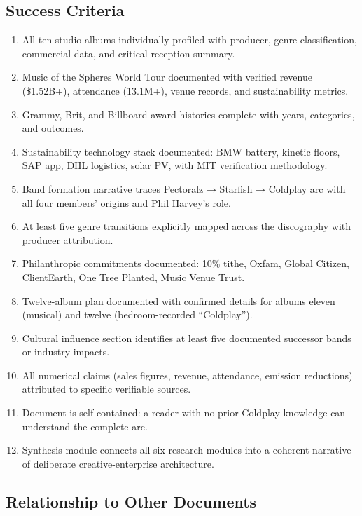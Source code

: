 \documentclass[11pt,letterpaper]{article}
\begin{document}
\subsection{Success Criteria}

\begin{enumerate}[leftmargin=2em]
  \item All ten studio albums individually profiled with producer, genre classification, commercial data, and critical reception summary.
  \item Music of the Spheres World Tour documented with verified revenue (\$1.52B+), attendance (13.1M+), venue records, and sustainability metrics.
  \item Grammy, Brit, and Billboard award histories complete with years, categories, and outcomes.
  \item Sustainability technology stack documented: BMW battery, kinetic floors, SAP app, DHL logistics, solar PV, with MIT verification methodology.
  \item Band formation narrative traces Pectoralz → Starfish → Coldplay arc with all four members' origins and Phil Harvey's role.
  \item At least five genre transitions explicitly mapped across the discography with producer attribution.
  \item Philanthropic commitments documented: 10\% tithe, Oxfam, Global Citizen, ClientEarth, One Tree Planted, Music Venue Trust.
  \item Twelve-album plan documented with confirmed details for albums eleven (musical) and twelve (bedroom-recorded ``Coldplay'').
  \item Cultural influence section identifies at least five documented successor bands or industry impacts.
  \item All numerical claims (sales figures, revenue, attendance, emission reductions) attributed to specific verifiable sources.
  \item Document is self-contained: a reader with no prior Coldplay knowledge can understand the complete arc.
  \item Synthesis module connects all six research modules into a coherent narrative of deliberate creative-enterprise architecture.
\end{enumerate}

\subsection{Relationship to Other Documents}
\end{document}
